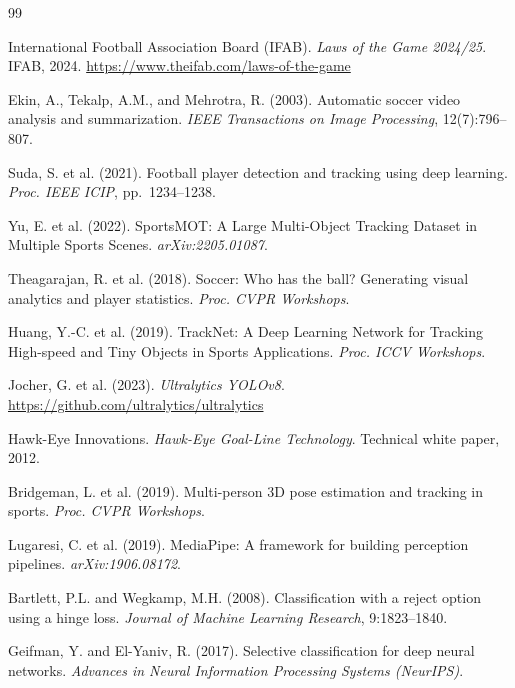 \documentclass[12pt,a4paper,twoside]{article}
\begin{document}

\begin{thebibliography}{99}

International Football Association Board (IFAB).
\textit{Laws of the Game 2024/25}.
IFAB, 2024.
\url{https://www.theifab.com/laws-of-the-game}

Ekin, A., Tekalp, A.M., and Mehrotra, R. (2003).
Automatic soccer video analysis and summarization.
\textit{IEEE Transactions on Image Processing}, 12(7):796--807.

Suda, S. et al. (2021).
Football player detection and tracking using deep learning.
\textit{Proc. IEEE ICIP}, pp.~1234--1238.

Yu, E. et al. (2022).
SportsMOT: A Large Multi-Object Tracking Dataset in Multiple Sports Scenes.
\textit{arXiv:2205.01087}.

Theagarajan, R. et al. (2018).
Soccer: Who has the ball? Generating visual analytics and player statistics.
\textit{Proc. CVPR Workshops}.

Huang, Y.-C. et al. (2019).
TrackNet: A Deep Learning Network for Tracking High-speed and Tiny Objects in
Sports Applications.
\textit{Proc. ICCV Workshops}.

Jocher, G. et al. (2023).
\textit{Ultralytics YOLOv8}.
\url{https://github.com/ultralytics/ultralytics}

Hawk-Eye Innovations.
\textit{Hawk-Eye Goal-Line Technology}.
Technical white paper, 2012.

Bridgeman, L. et al. (2019).
Multi-person 3D pose estimation and tracking in sports.
\textit{Proc. CVPR Workshops}.

Lugaresi, C. et al. (2019).
MediaPipe: A framework for building perception pipelines.
\textit{arXiv:1906.08172}.

Bartlett, P.L. and Wegkamp, M.H. (2008).
Classification with a reject option using a hinge loss.
\textit{Journal of Machine Learning Research}, 9:1823--1840.

Geifman, Y. and El-Yaniv, R. (2017).
Selective classification for deep neural networks.
\textit{Advances in Neural Information Processing Systems (NeurIPS)}.

\end{thebibliography}
\end{document}

